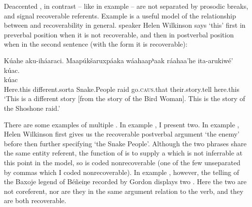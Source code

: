 \documentclass[output=paper]{LSP/langsci}
\begin{document}
Deaccented , in contrast -- like  in example  -- are not separated by prosodic breaks, and signal recoverable referents. Example  is a useful model of the relationship between  and recoverability in general.  speaker Helen Wilkinson says  `this' first in preverbal position when it is not recoverable, and then in postverbal position when in the second sentence (with the form  it is recoverable):

\ea\label{wilkinsonpostverbal}
Kúahe aku-iháaraci. Maapúkšaruxpáaka wáahaapʰaak ráahaa’he ita-arukiwé’ kúac.\rmfnm\\
\gll	{}		 	 						kúac\\
	Here.this 		different.sorta		Snake.People 					raid 						go.\textsc{caus}.that 				their.story.tell 					here.this\\
\glt	`This is a different story [from the story of the Bird Woman]. This is the story of the Shoshone raid.'
\z

There are some examples of multiple . In example , I present two. In example , Helen Wilkinson first gives us the recoverable postverbal argument  `the enemy' before then further specifying  `the Snake People'. Although the two phrases share the same entity referent, the function of  is to supply a  which is not inferrable at this point in the  model, so  is coded nonrecoverable (one of the few unseparated by commas which I coded nonrecoverable). In example , however, the telling of the Baxoje legend of Béñeiŋe recorded by Gordon \citet{Marsh1936} displays two . Here the two are not coreferent, nor are they in the same argument relation to the verb, and they are both recoverable. 
\end{document}
